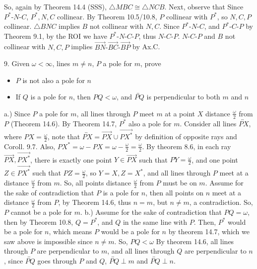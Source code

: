 \documentclass{report}
\begin{document}
    \bigbreak \noindent 
    So, again by Theorem 14.4 (SSS), $\triangle MBC \cong \triangle NCB$.
    \bigbreak \noindent 
    Next, observe that Since $ P^{*}\text{-}N\text{-}C$, $P^{*},N,C$ collinear. By Theorem 10.5/10.8, $P$ collinear with $P^{*}$, so $N,C,P$ collinear. $\triangle BNC$ implies $B$ not collinear with $N,C$. 
    \bigbreak \noindent 
    Since $ P^{*}\text{-}N\text{-}C$, and $ P^{*}\text{-}C\text{-}P$ by Theorem 9.1, by the ROI we have $ P^{*}\text{-}N\text{-}C\text{-}P $, thus $ N\text{-}C\text{-}P$.
    \bigbreak \noindent 
    $ N\text{-}C\text{-}P$ and $B$ not collinear with $N,C,P$ implies $ \overrightarrow{BN}\text{-}\overrightarrow{BC}\text{-}\overrightarrow{BP}$ by Ax.C.
     

    \bigbreak \noindent 
    \begin{mdframed}
        9. Given $\omega < \infty$, lines $m\ne n$, $P$ a pole for $m$, prove
        \begin{itemize}
            \item $P$ is not also a pole for $n$
            \item If $Q $ is a pole for $n$, then $PQ < \omega$, and $\overleftrightarrow{PQ}$ is perpendicular to both $m$ and $n$
        \end{itemize}
    \end{mdframed}
    \bigbreak \noindent 
    a.) Since $P$ a pole for $m$, all lines through $P$ meet $m$ at a point $X$ distance $\frac{\omega}{2 }$ from $P$ (Theorem 14.6). By Theorem 14.7, $P^{*}$ also a pole for $m$. Consider all lines $\overleftrightarrow{PX}$, where $PX = \frac{\omega}{2}$, note that $\overleftrightarrow{PX} = \overrightarrow{PX} \cup \overrightarrow{PX^{*}}$ by definition of opposite rays and Coroll. 9.7. Also, $PX^{*} = \omega - PX = \omega - \frac{\omega}{2} = \frac{\omega}{2} $. By theorem 8.6, in each ray $\overrightarrow{PX}, \overrightarrow{PX^{*}}$, there is exactly one point $Y \in \overrightarrow{PX}$ such that $PY = \frac{\omega}{2}$, and one point $Z  \in \overrightarrow{PX^{*}}$ such that $PZ = \frac{\omega}{2}$, so $Y = X, Z = X^{*} $, and all lines through $P$ meet at a distance $\frac{\omega}{2}$ from $m$. So, all points distance $\frac{\omega}{2}$ from $P$ must be on $m$.
    \bigbreak \noindent 
    Assume for the sake of contradiction that $P$ is a pole for $n$, then all points on $n$ meet at a distance $\frac{\omega}{2}$ from $P$, by Theorem 14.6, thus $n = m$, but $n \ne m$, a contradiction. So, $P$ cannot be a pole for $m$.
    \bigbreak \noindent 
    b.) Assume for the sake of contradiction that $PQ = \omega$, then by Theorem 10.8, $Q = P^{*}$, and $Q$ in the same line with $P$. 
    \bigbreak \noindent 
    Then, $P^{*}$ would be a pole for $n$, which means $P$ would be a pole for $n$ by theorem 14.7, which we saw above is impossible since $n\ne m$. So, $ PQ < \omega$
    \bigbreak \noindent 
    By theorem 14.6, all lines through $P$ are perpendicular to $m$, and all lines through $Q$ are perpendicular to $n$, since $\overleftrightarrow{PQ}$ goes through $P$ and $Q$, $\overleftrightarrow{PQ} \perp m$ and $\overleftrightarrow{PQ} \perp n $.






    
\end{document}
